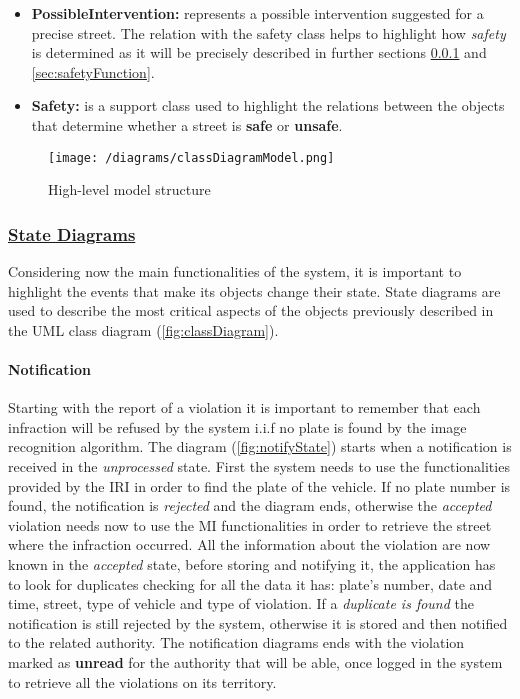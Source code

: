 \begin{itemize}
		\item \textbf{PossibleIntervention:} represents a possible intervention suggested for a precise street. The relation with the safety class helps to highlight how \emph{safety} is determined as it will be precisely described in further sections \ref{sec:stateDiagrams} and \ref{sec:safetyFunction}.
		
		\item \textbf{Safety:} is a support class used to highlight the relations between the objects that determine whether a street is \textbf{safe} or \textbf{unsafe}.
	\end{itemize}
	
	\begin{figure}[h!]
		\centering
		\texttt{[image: /diagrams/classDiagramModel.png]}
		\caption{\label{fig:classDiagram}High-level model structure}
	\end{figure}

	\FloatBarrier
	
	\subsubsection[State Diagrams]{\hyperlink{toc}{State Diagrams}}
	\label{sec:stateDiagrams}
		Considering now the main functionalities of the system, it is important to highlight the events that make its objects change their state. State diagrams are used to describe the most critical aspects of the objects previously described in the UML class diagram (\autoref{fig:classDiagram}).
		
		\paragraph{Notification}
			Starting with the report of a violation it is important to remember that each infraction will be refused by the system i.i.f no plate is found by the image recognition algorithm. The diagram (\autoref{fig:notifyState}) starts when a notification is received in the \textit{unprocessed} state. First the system needs to use the functionalities provided by the IRI in order to find the plate of the vehicle. If no plate number is found, the notification is \textit{rejected} and the diagram ends, otherwise the \textit{accepted} violation needs now to use the MI functionalities in order to retrieve the street where the infraction occurred. All the information about the violation are now known in the \textit{accepted} state, before storing and notifying it, the application has to look for duplicates checking for all the data it has: plate's number, date and time, street, type of vehicle and type of violation. If a \textit{duplicate is found} the notification is still rejected by the system, otherwise it is stored and then notified to the related authority. The notification diagrams ends with the violation marked as \textbf{unread} for the authority that will be able, once logged in the system to retrieve all the violations on its territory.
			
